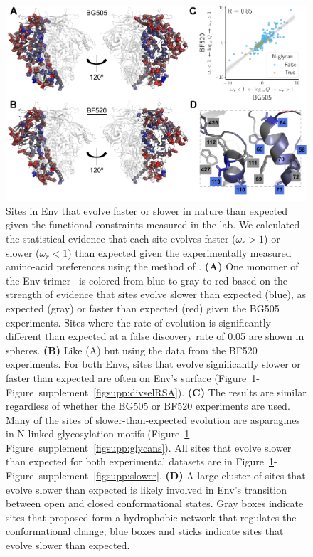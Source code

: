 \documentclass[9pt]{elife}
\begin{document}
\begin{figure}
\includegraphics[width=1.0\textwidth]{figures/omegabysite_structural_analysis/omegabysite_structural_analysis.pdf}
\caption{\label{fig:divsel}
Sites in Env that evolve faster or slower in nature than expected given the functional constraints measured in the lab.
We calculated the statistical evidence that each site evolves faster ($\omega_r > 1$) or slower ($\omega_r < 1$) than expected given the experimentally measured amino-acid preferences using the method of \citet{bloom2017identification}.
{\bf (A)}
One monomer of the Env trimer~\citep[PDB 5FYL;][]{stewart2016trimeric} is colored from blue to gray to red based on the strength of evidence that sites evolve slower than expected (blue), as expected (gray) or faster than expected (red) given the BG505 experiments.
Sites where the rate of evolution is significantly different than expected at a false discovery rate of 0.05 are shown in spheres.
{\bf (B)}
Like (A) but using the data from the BF520 experiments.
For both Envs, sites that evolve significantly slower or faster than expected are often on Env's surface (Figure~\ref{fig:divsel}-Figure~supplement~\ref{figsupp:divselRSA}).
{\bf (C)}
The results are similar regardless of whether the BG505 or BF520 experiments are used.
Many of the sites of slower-than-expected evolution are asparagines in N-linked glycosylation motifs (Figure~\ref{fig:divsel}-Figure~supplement~\ref{figsupp:glycans}).
All sites that evolve slower than expected for both experimental datasets are in Figure~\ref{fig:divsel}-Figure~supplement~\ref{figsupp:slower}.
{\bf (D)} 
A large cluster of sites that evolve slower than expected is likely involved in Env's transition between open and closed conformational states.
Gray boxes indicate sites that \citet[PDB 5VN3]{ozorowski2017open} proposed form a hydrophobic network that regulates the conformational change; blue boxes and sticks indicate sites that evolve slower than expected.
}
\end{figure}
\end{document}
